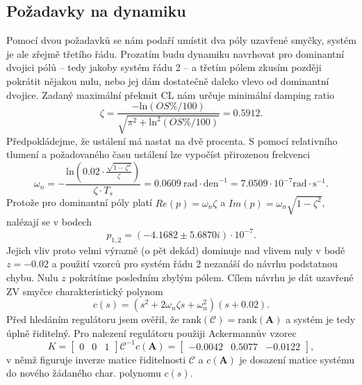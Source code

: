 \documentclass[twoside]{article}
\begin{document}
\subsection{Požadavky na dynamiku}
Pomocí dvou požadavků se nám podaří umístit dva póly uzavřené smyčky, systém je ale zřejmě třetího řádu. Prozatím budu dynamiku 
navrhovat pro dominantní dvojici pólů -- tedy jakoby systém řádu 2 -- a třetím pólem zkusím později pokrátit nějakou nulu, nebo jej 
dám dostatečně daleko vlevo od dominantní dvojice. Zadaný maximální překmit CL nám určuje minimální damping ratio
\begin{equation}
	\zeta = \frac{- \text{ln}(OS\%/100)}{\sqrt{\pi^2 + \text{ln}^2(OS\%/100)}} = 0.5912.
\end{equation}
Předpokládejme, že ustálení má nastat na dvě procenta.
S pomocí relativního tlumení a požadovaného času ustálení lze vypočíst přirozenou frekvenci
\begin{equation}
	\omega_n =  -\frac{\text{ln}(0.02 \cdot \frac{\sqrt{1-\zeta^2}}{\zeta})}{\zeta \cdot T_s}
	 = 0.0609~\text{rad} \cdot \text{den}^{-1} = 7.0509 \cdot 10^{-7} \text{rad} \cdot \text{s}^{-1}.
\end{equation}
Protože pro dominantní póly platí $Re(p) = \omega_n \zeta$ a $Im(p) = \omega_n \sqrt{1-\zeta^2}$, nalézají se v bodech 
\begin{equation}
	p_{1,2} = (-4.1682 \pm 5.6870i) \cdot 10^{-7}.
\end{equation}
Jejich vliv proto velmi výrazně (o pět dekád) dominuje nad vlivem nuly v bodě $z = -0.02$ a použití vzorců pro 
systém řádu 2 nezanáší do návrhu podstatnou chybu.
Nulu $z$ pokrátíme posledním zbylým pólem. Cílem návrhu je dát uzavřené ZV smyčce charakteristický polynom
\begin{equation}
	c(s) = (s^2 + 2\omega_n \zeta s + \omega_n^2) (s+0.02).
\end{equation}
Před hledáním regulátoru jsem ověřil, že $\text{rank}(\mathcal{C}) = \text{rank}(\mathbf{A})$ a systém je tedy úplně řiditelný.
Pro nalezení regulátoru použiji Ackermannův vzorec
\begin{equation}
	K = \begin{bmatrix}
		0 & 0 & 1
	\end{bmatrix} \mathcal{C}^{-1}  c(\mathbf{A}) = \begin{bmatrix}
		-0.0042 & 0.5077 & -0.0122
	\end{bmatrix},
	\label{eq:acker}
\end{equation}
v němž figuruje inverze matice řiditelnosti $\mathcal{C}$ a $c(\mathbf{A})$ je dosazení matice 
systému do nového žádaného char. polynomu $c(s)$.
\end{document}
